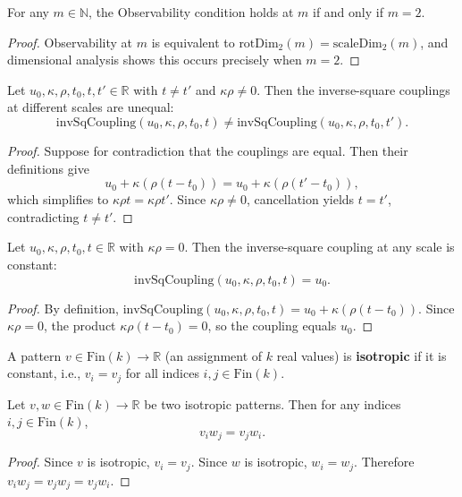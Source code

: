 \begin{theorem}
For any $m \in \mathbb{N}$, the Observability condition holds at $m$ if and only if $m = 2$.
\begin{proof}
Observability at $m$ is equivalent to $\text{rotDim}_2(m) = \text{scaleDim}_2(m)$, and dimensional analysis shows this occurs precisely when $m = 2$.
\end{proof}
\end{theorem}

\begin{theorem}
Let $u_0, \kappa, \rho, t_0, t, t' \in \mathbb{R}$ with $t \neq t'$ and $\kappa \rho \neq 0$. Then the inverse-square couplings at different scales are unequal:
\[
\text{invSqCoupling}(u_0, \kappa, \rho, t_0, t) \neq \text{invSqCoupling}(u_0, \kappa, \rho, t_0, t').
\]
\begin{proof}
Suppose for contradiction that the couplings are equal. Then their definitions give
\[
u_0 + \kappa(\rho(t - t_0)) = u_0 + \kappa(\rho(t' - t_0)),
\]
which simplifies to $\kappa \rho t = \kappa \rho t'$. Since $\kappa \rho \neq 0$, cancellation yields $t = t'$, contradicting $t \neq t'$.
\end{proof}
\end{theorem}

\begin{theorem}
Let $u_0, \kappa, \rho, t_0, t \in \mathbb{R}$ with $\kappa \rho = 0$. Then the inverse-square coupling at any scale is constant:
\[
\text{invSqCoupling}(u_0, \kappa, \rho, t_0, t) = u_0.
\]
\begin{proof}
By definition, $\text{invSqCoupling}(u_0, \kappa, \rho, t_0, t) = u_0 + \kappa(\rho(t - t_0))$. Since $\kappa \rho = 0$, the product $\kappa \rho (t - t_0) = 0$, so the coupling equals $u_0$.
\end{proof}
\end{theorem}

\begin{definition}
A pattern $v \in \text{Fin}(k) \to \mathbb{R}$ (an assignment of $k$ real values) is \textbf{isotropic} if it is constant, i.e., $v_i = v_j$ for all indices $i, j \in \text{Fin}(k)$.
\end{definition}

\begin{theorem}
Let $v, w \in \text{Fin}(k) \to \mathbb{R}$ be two isotropic patterns. Then for any indices $i, j \in \text{Fin}(k)$,
\[
v_i w_j = v_j w_i.
\]
\begin{proof}
Since $v$ is isotropic, $v_i = v_j$. Since $w$ is isotropic, $w_i = w_j$. Therefore $v_i w_j = v_j w_j = v_j w_i$.
\end{proof}
\end{theorem}

